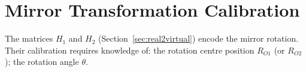 \section{Mirror Transformation Calibration}
\label{sec:mirror-calib}

The matrices $H_1$ and $H_2$
(Section~\ref{sec:real2virtual}) encode the mirror
rotation.
%
Their calibration requires knowledge of:
the rotation centre position $R_{O1}$
(or $R_{O2}$);
the rotation angle $\theta$.

